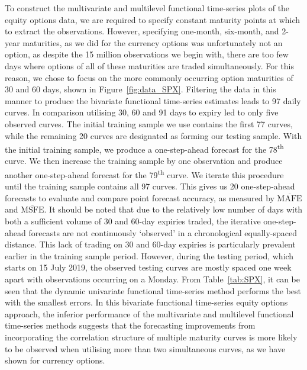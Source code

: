 \documentclass[12pt,a4paper]{article}
\begin{document}
To construct the multivariate and multilevel functional time-series plots of the equity options data, we are required to specify constant maturity points at which to extract the observations. However, specifying one-month, six-month, and 2-year maturities, as we did for the currency options was unfortunately not an option, as despite the 15 million observations we begin with, there are too few days where options of all of these maturities are traded simultaneously. For this reason, we chose to focus on the more commonly occurring option maturities of 30 and 60 days, shown in Figure~\ref{fig:data_SPX}. Filtering the data in this manner to produce the bivariate functional time-series estimates leads to 97 daily curves. In comparison utilising 30, 60 and 91 days to expiry led to only five observed curves. The initial training sample we use contains the first 77 curves, while the remaining 20 curves are designated as forming our testing sample. With the initial training sample, we produce a one-step-ahead forecast for the 78\textsuperscript{th} curve. We then increase the training sample by one observation and produce another one-step-ahead forecast for the 79\textsuperscript{th} curve. We iterate this procedure until the training sample contains all 97 curves. This gives us 20 one-step-ahead forecasts to evaluate and compare point forecast accuracy, as measured by $\overline{\text{MAFE}}$ and $\overline{\text{MSFE}}$. It should be noted that due to the relatively low number of days with both a sufficient volume of 30 and 60-day expiries traded, the iterative one-step-ahead forecasts are not continuously `observed' in a chronological equally-spaced distance. This lack of trading on 30 and 60-day expiries is particularly prevalent earlier in the training sample period. However, during the testing period, which starts on 15 July 2019, the observed testing curves are mostly spaced one week apart with observations occurring on a Monday. From Table~\ref{tab:SPX}, it can be seen that the dynamic univariate functional time-series method performs the best with the smallest errors. In this bivariate functional time-series equity options approach, the inferior performance of the multivariate and multilevel functional time-series methods suggests that the forecasting improvements from incorporating the correlation structure of multiple maturity curves is more likely to be observed when utilising more than two simultaneous curves, as we have shown for currency options.
\end{document}

